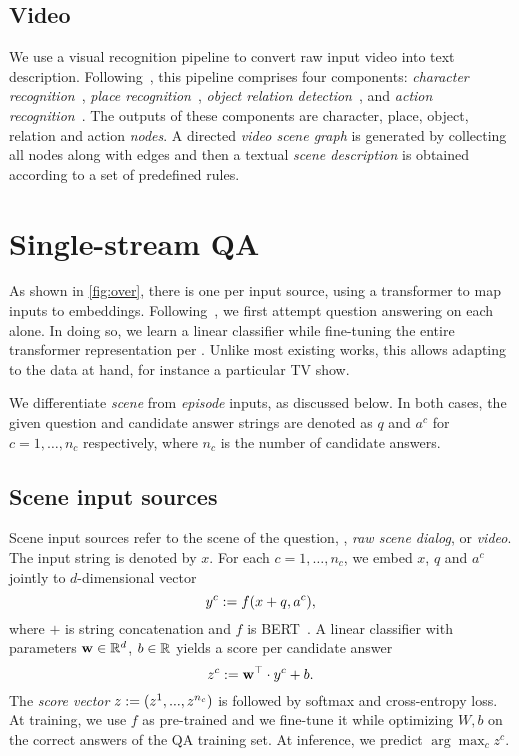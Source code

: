 \documentclass[10pt,twocolumn,letterpaper]{article}
\begin{document}
\subsection{Video}
\label{sec:video}

We use a visual recognition pipeline to convert raw input video into text description. Following~\cite{garcia2020knowledge}, this pipeline comprises four components: \emph{character recognition}~\cite{schroff2015facenet}, \emph{place recognition}~\cite{zhou2017places}, \emph{object relation detection}~\cite{zhang2019large}, and \emph{action recognition}~\cite{wu2019long}. The outputs of these components are character, place, object, relation and action \emph{nodes}. A directed \emph{video scene graph} is generated by collecting all nodes along with edges and then a textual \emph{scene description} is obtained according to a set of predefined rules.
 \section{Single-stream QA}
\label{sec:stream}

As shown in \autoref{fig:over}, there is one \branch per input source, using a transformer to map inputs to embeddings. Following~\cite{garcia2020knowledge}, we first attempt question answering on each \branch alone. In doing so, we learn a linear classifier while fine-tuning the entire transformer representation per \branch. Unlike most existing works, this allows adapting to the data at hand, for instance a particular TV show.

We differentiate \emph{scene} from \emph{episode} inputs, as discussed below. In both cases, the given question and candidate answer strings are denoted as $q$ and $a^c$ for $c=1,\dots,n_c$ respectively, where $n_c$ is the number of candidate answers.



\subsection{Scene input sources}
\label{sec:short}

Scene input sources refer to the scene of the question, \ie, \emph{raw scene dialog}, \emph{\sceneSum} or \emph{video}. The input string is denoted by $x$. For each $c=1,\dots,n_c$, we embed $x$, $q$ and $a^c$ jointly to $d$-dimensional vector
\begin{equation} 
	y^c \mathrel{:=} f(x + q, a^c),
\label{eq:short-bert}
\end{equation}
where $+$ is string concatenation and $f$ is BERT~. A linear classifier with parameters $\mathbf{w} \in \mathbb{R}^d$, $b \in \mathbb{R}$ yields a score per candidate answer
\begin{equation}
	z^c \mathrel{:=} \mathbf{w}^\top \cdot y^c + b.
\label{eq:short-class}
\end{equation}
The \emph{score vector} $z \mathrel{:=} (z^1, ..., z^{n_c})$ is followed by softmax and cross-entropy loss. At training, we use $f$ as  pre-trained and we fine-tune it while optimizing $W,b$ on the correct answers of the QA training set. At inference, we predict $\arg\max_c z^c$.
\end{document}
